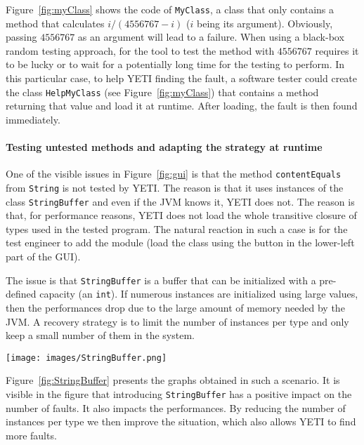 Figure~\ref{fig:myClass} shows the code of \texttt{MyClass}, a class that only contains a method that calculates $i/(4556767-i)$ ($i$ being its argument). Obviously, passing $4556767$ as an argument will lead to a failure. When using a black-box random testing approach, for the tool to test the method with $4556767$ 
requires it to be lucky or to wait for a potentially long time for the testing to perform. 
In this particular case, to help YETI finding the fault, a software tester could create the class \texttt{HelpMyClass} (see Figure~\ref{fig:myClass}) that contains a method returning that value and load it at runtime.
After loading, the fault is then found immediately.

\paragraph{Testing untested methods and adapting the strategy at runtime}

One of the visible issues in Figure~\ref{fig:gui} is that the method \texttt{contentEquals} from \texttt{String} is not tested by YETI. The reason is that it uses instances of the class \texttt{StringBuffer} and even if the JVM knows it, YETI does not. The reason is that, for performance reasons, YETI does not load the whole transitive closure of types used in the tested program. The natural reaction in such a case is for the test engineer to add the module (load the class using the button in the lower-left part of the GUI). 

The issue is that \texttt{StringBuffer} is a buffer that can be initialized with a pre-defined capacity (an \texttt{int}). If numerous instances are initialized using large values, then the performances drop due to the large amount of memory needed by the JVM. A recovery strategy is to limit the number of instances per type and only keep a small number of them in the system.

\begin{figure*}[ht!]
\begin{center}
\texttt{[image: images/StringBuffer.png]}
\end{center}
\caption{Testing \texttt{String}, adding \texttt{StringBuffer}, and then reducing the number of instances per type (in this case 2).}\label{fig:StringBuffer}
\end{figure*}

Figure~\ref{fig:StringBuffer} presents the graphs obtained in such a scenario. It is visible in the figure that introducing \texttt{StringBuffer} has a positive impact on the number of faults. It also impacts the performances. By reducing the number of instances per type we then improve the situation, which also allows YETI to find more faults.